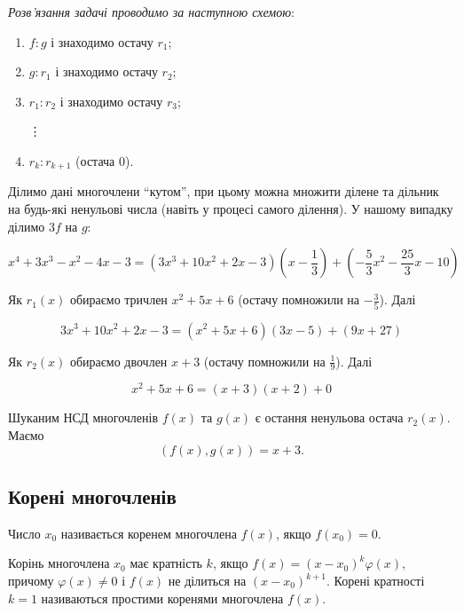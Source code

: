 \begin{solution}
    \textit{Розв’язання задачі проводимо за наступною схемою}:
    
    \begin{enumerate}
        \item $f:g$ і знаходимо остачу $r_1$; 
        \item $g:r_1$ і знаходимо остачу $r_2$;
        \item $r_1:r_2$ і знаходимо остачу $r_3$;
        
        \indent \vdots
    
        \item $r_k:r_{k+1}$ (остача 0).
    \end{enumerate}
    
    Ділимо дані многочлени “кутом”, при цьому можна множити ділене та дільник
    на будь-які ненульові числа (навіть у процесі самого ділення). У нашому випадку
    ділимо $3f$ на $g$:
    
    $$x^4 + 3x^3 - x^2 -4x -3 = (3x^3 + 10x^2 + 2x - 3)(x - \dfrac{1}{3}) + (-\dfrac{5}{3}x^2 - \dfrac{25}{3}x - 10)$$
    
    Як $r_1(x)$ обираємо тричлен $x^2 + 5x +6$ (остачу помножили на $-\frac{3}{5}$). Далі
    
    $$3x^3 + 10x^2 + 2x - 3 = (x^2 + 5x + 6)(3x - 5) + (9x + 27)$$
    
    Як $r_2(x)$ обираємо двочлен $x+3$ (остачу помножили на $\frac{1}{9}$). Далі
    
    $$x^2 + 5x + 6 = (x + 3)(x + 2) + 0$$
    
    Шуканим НСД многочленів $f(x)$ та $g(x)$ є остання ненульова остача $r_2(x)$.
    Маємо
    \begin{equation*}
        (f(x), g(x)) = x + 3.
    \end{equation*}
\end{solution}

\subsection{Корені многочленів}

\begin{definition}
	Число $x_0$ називається коренем многочлена $f(x)$, якщо $f(x_0) = 0$.
\end{definition}

\begin{definition}
	Корінь многочлена $x_0$ має кратність $k$, якщо $f(x) = (x-x_0)^k\varphi(x)$,
	причому $\varphi(x) \neq 0$ і $f(x)$ не ділиться на $(x-x_0)^{k+1}$. Корені кратності $k = 1$
	називаються простими коренями многочлена $f(x)$.
\end{definition}

